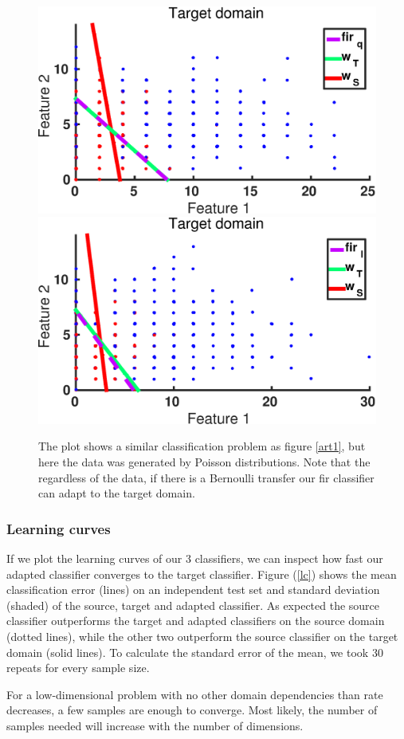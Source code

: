 \documentclass[twoside,11pt]{article}
\begin{document}
\begin{figure}[ht]
\centering
\includegraphics[width=.45\textwidth]{images/da_artexp_sens_model_convergence_Poisson_square.eps} \hspace{5px}
\includegraphics[width=.45\textwidth]{images/da_artexp_sens_model_convergence_Poisson_log.eps}
\caption{The plot shows a similar classification problem as figure \ref{art1}, but here the data was generated by Poisson distributions. Note that the regardless of the data, if there is a Bernoulli transfer our fir classifier can adapt to the target domain.}
\label{art2}
\end{figure}

\subsubsection{Learning curves}
If we plot the learning curves of our 3 classifiers, we can inspect how fast our adapted classifier converges to the target classifier. Figure (\ref{lc}) shows the mean classification error (lines) on an independent test set and standard deviation (shaded) of the source, target and adapted classifier. As expected the source classifier outperforms the target and adapted classifiers on the source domain (dotted lines), while the other two outperform the source classifier on the target domain (solid lines). To calculate the standard error of the mean, we took 30 repeats for every sample size. 

For a low-dimensional problem with no other domain dependencies than rate decreases, a few samples are enough to converge. Most likely, the number of samples needed will increase with the number of dimensions.
\end{document}
